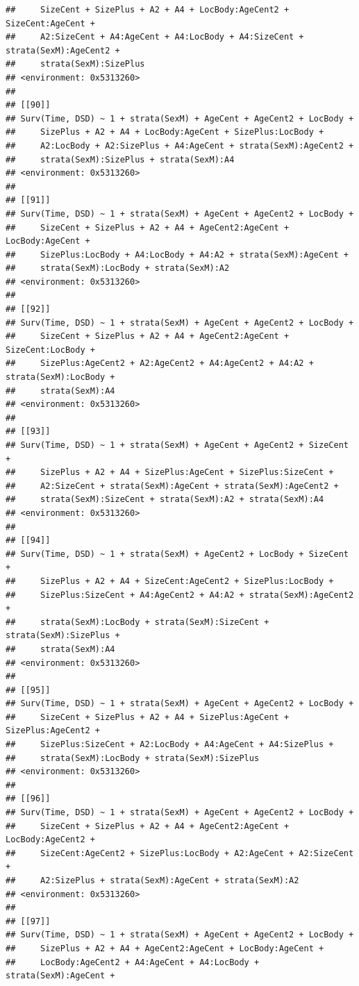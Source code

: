\documentclass{article}\usepackage[]{graphicx}\usepackage[]{color}
\makeatletter
\newenvironment{kframe}{%
 \def\at@end@of@kframe{}%
 \ifinner\ifhmode%
  \def\at@end@of@kframe{\end{minipage}}%
  \begin{minipage}{\columnwidth}%
 \fi\fi%
 \def\FrameCommand##1{\hskip\@totalleftmargin \hskip-\fboxsep
 \colorbox{shadecolor}{##1}\hskip-\fboxsep
     \hskip-\linewidth \hskip-\@totalleftmargin \hskip\columnwidth}%
 \MakeFramed {\advance\hsize-\width
   \@totalleftmargin\z@ \linewidth\hsize
   \@setminipage}}%
 {\par\unskip\endMakeFramed%
 \at@end@of@kframe}
\newenvironment{knitrout}{}{} %
\makeatother
\begin{document}
\begin{knitrout}
\begin{kframe}
\begin{verbatim}
##     SizeCent + SizePlus + A2 + A4 + LocBody:AgeCent2 + SizeCent:AgeCent + 
##     A2:SizeCent + A4:AgeCent + A4:LocBody + A4:SizeCent + strata(SexM):AgeCent2 + 
##     strata(SexM):SizePlus
## <environment: 0x5313260>
## 
## [[90]]
## Surv(Time, DSD) ~ 1 + strata(SexM) + AgeCent + AgeCent2 + LocBody + 
##     SizePlus + A2 + A4 + LocBody:AgeCent + SizePlus:LocBody + 
##     A2:LocBody + A2:SizePlus + A4:AgeCent + strata(SexM):AgeCent2 + 
##     strata(SexM):SizePlus + strata(SexM):A4
## <environment: 0x5313260>
## 
## [[91]]
## Surv(Time, DSD) ~ 1 + strata(SexM) + AgeCent + AgeCent2 + LocBody + 
##     SizeCent + SizePlus + A2 + A4 + AgeCent2:AgeCent + LocBody:AgeCent + 
##     SizePlus:LocBody + A4:LocBody + A4:A2 + strata(SexM):AgeCent + 
##     strata(SexM):LocBody + strata(SexM):A2
## <environment: 0x5313260>
## 
## [[92]]
## Surv(Time, DSD) ~ 1 + strata(SexM) + AgeCent + AgeCent2 + LocBody + 
##     SizeCent + SizePlus + A2 + A4 + AgeCent2:AgeCent + SizeCent:LocBody + 
##     SizePlus:AgeCent2 + A2:AgeCent2 + A4:AgeCent2 + A4:A2 + strata(SexM):LocBody + 
##     strata(SexM):A4
## <environment: 0x5313260>
## 
## [[93]]
## Surv(Time, DSD) ~ 1 + strata(SexM) + AgeCent + AgeCent2 + SizeCent + 
##     SizePlus + A2 + A4 + SizePlus:AgeCent + SizePlus:SizeCent + 
##     A2:SizeCent + strata(SexM):AgeCent + strata(SexM):AgeCent2 + 
##     strata(SexM):SizeCent + strata(SexM):A2 + strata(SexM):A4
## <environment: 0x5313260>
## 
## [[94]]
## Surv(Time, DSD) ~ 1 + strata(SexM) + AgeCent2 + LocBody + SizeCent + 
##     SizePlus + A2 + A4 + SizeCent:AgeCent2 + SizePlus:LocBody + 
##     SizePlus:SizeCent + A4:AgeCent2 + A4:A2 + strata(SexM):AgeCent2 + 
##     strata(SexM):LocBody + strata(SexM):SizeCent + strata(SexM):SizePlus + 
##     strata(SexM):A4
## <environment: 0x5313260>
## 
## [[95]]
## Surv(Time, DSD) ~ 1 + strata(SexM) + AgeCent + AgeCent2 + LocBody + 
##     SizeCent + SizePlus + A2 + A4 + SizePlus:AgeCent + SizePlus:AgeCent2 + 
##     SizePlus:SizeCent + A2:LocBody + A4:AgeCent + A4:SizePlus + 
##     strata(SexM):LocBody + strata(SexM):SizePlus
## <environment: 0x5313260>
## 
## [[96]]
## Surv(Time, DSD) ~ 1 + strata(SexM) + AgeCent + AgeCent2 + LocBody + 
##     SizeCent + SizePlus + A2 + A4 + AgeCent2:AgeCent + LocBody:AgeCent2 + 
##     SizeCent:AgeCent2 + SizePlus:LocBody + A2:AgeCent + A2:SizeCent + 
##     A2:SizePlus + strata(SexM):AgeCent + strata(SexM):A2
## <environment: 0x5313260>
## 
## [[97]]
## Surv(Time, DSD) ~ 1 + strata(SexM) + AgeCent + AgeCent2 + LocBody + 
##     SizePlus + A2 + A4 + AgeCent2:AgeCent + LocBody:AgeCent + 
##     LocBody:AgeCent2 + A4:AgeCent + A4:LocBody + strata(SexM):AgeCent + 

\end{verbatim}
\end{kframe}
\end{knitrout}
\end{document}
